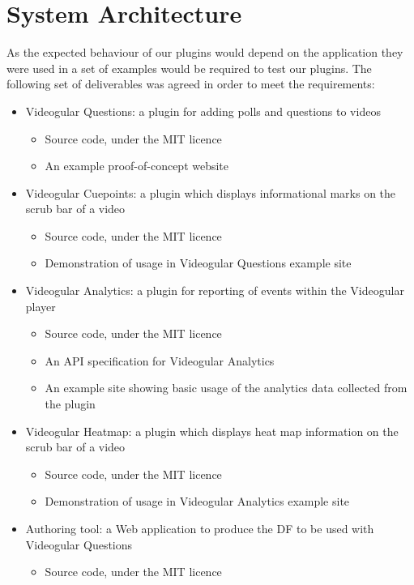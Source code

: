 \section{System Architecture}

As the expected behaviour of our plugins would depend on the application they were used in a set of examples would be required to test our plugins. The following set of deliverables was agreed in order to meet the requirements:

\begin{itemize}
\item Videogular Questions: a plugin for adding polls and questions to videos
\begin{itemize}
\item Source code, under the MIT licence
\item An example proof-of-concept website
\end{itemize}
\item Videogular Cuepoints: a plugin which displays informational marks on the scrub bar of a video
\begin{itemize}
\item Source code, under the MIT licence
\item Demonstration of usage in Videogular Questions example site
\end{itemize}
\item Videogular Analytics: a plugin for reporting of events within the Videogular player
\begin{itemize}
\item Source code, under the MIT licence
\item An API specification for Videogular Analytics
\item An example site showing basic usage of the analytics data collected from the plugin
\end{itemize}
\item Videogular Heatmap: a plugin which displays heat map information on the scrub bar of a video
\begin{itemize}
\item Source code, under the MIT licence
\item Demonstration of usage in Videogular Analytics example site
\end{itemize}
\item Authoring tool: a Web application to produce the \gls{DF} to be used with Videogular Questions
\begin{itemize}
\item Source code, under the MIT licence
\end{itemize}
\end{itemize}

